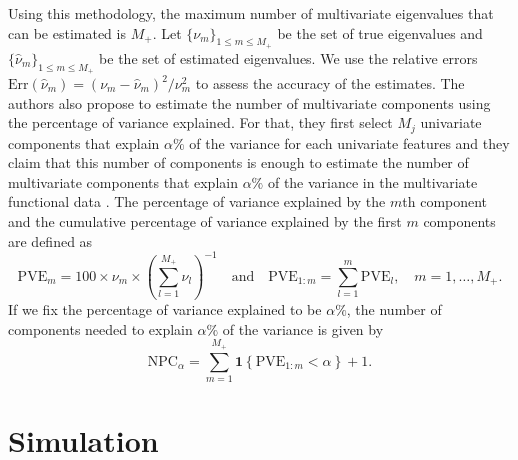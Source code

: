 Using this methodology, the maximum number of multivariate eigenvalues that can be estimated is $M_+$. Let $\{\nu_m\}_{1 \leq m \leq M_+}$ be the set of true eigenvalues and $\{\widehat{\nu}_m\}_{1 \leq m \leq M_+}$ be the set of estimated eigenvalues. We use the relative errors $\text{Err}(\widehat{\nu}_m)  = (\nu_m - \widehat{\nu}_m)^2 / \nu^2_m$ to assess the accuracy of the estimates. The authors also propose to estimate the number of multivariate components using the percentage of variance explained. For that, they first select $M_j$ univariate components that explain $\alpha\%$ of the variance for each univariate features \cite[Chapter 8.2]{ramsayFunctionalDataAnalysis2005} and they claim that this number of components is enough to estimate the number of multivariate components that explain $\alpha\%$ of the variance in the multivariate functional data \cite[Section 3.2]{happMultivariateFunctionalPrincipal2018}. The percentage of variance explained by the $m$th component and the cumulative percentage of variance explained by the first $m$ components are defined as
\begin{equation}\label{eq:pve}
     \text{PVE}_m = 100 \times \nu_m \times \left(\sum_{l = 1}^{M_+} \nu_l\right)^{-1} \quad\text{and}\quad \text{PVE}_{1:m} = \sum_{l = 1}^m \text{PVE}_l, \quad m = 1, \dots, M_+.
\end{equation}
If we fix the percentage of variance explained to be $\alpha\%$, the number of components needed to explain $\alpha\%$ of the variance is given by
\begin{equation}\label{eq:npc}
     \text{NPC}_{\alpha} = \sum_{m = 1}^{M_{+}} \mathbf{1}\left\{\text{PVE}_{1:m} < \alpha\right\} + 1.
\end{equation}



\section{Simulation} %
\label{sec:simulation}

